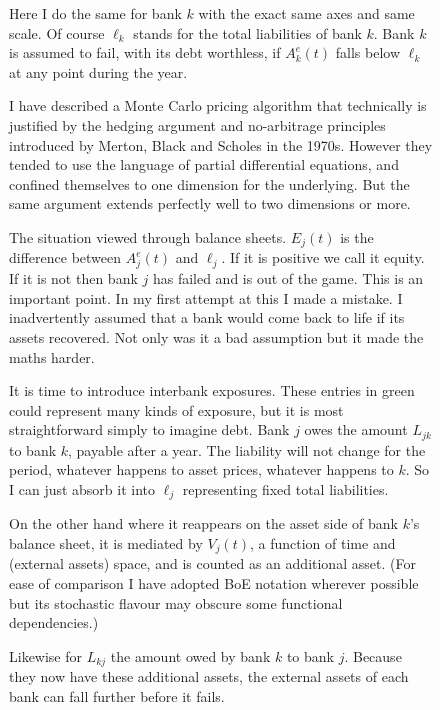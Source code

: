 \documentclass[a4paper,11pt]{article}
\newcommand{\ass}[2]{A^{e}_{#1}(#2)}
\newcommand{\lia}[1]{\ell_{#1}}
\newcommand{\val}[2]{V_{#1}(#2)}
\newcommand{\equ}[2]{E_{#1}(#2)}
\begin{document}
  \begin{figure}[H]
    \begin{center}
    \end{center}
    \ttfamily
    Here I do the same for bank $k$ with the exact same axes and same scale.
    Of course $\lia{k}$ stands for the total liabilities of bank $k$.
    Bank $k$ is assumed to fail, with its debt worthless, if $\ass{k}{t}$ falls below $\lia{k}$
    at any point during the year.

    I have described a Monte Carlo pricing algorithm that technically is justified by the hedging argument
    and no-arbitrage principles introduced by Merton, Black and Scholes in the 1970s.
    However they tended to use the language of partial differential equations,
    and confined themselves to one dimension for the underlying.
    But the same argument extends perfectly well to two dimensions or more.
  \end{figure}
  \begin{figure}[H]
    \begin{center}
    \end{center}
    \ttfamily
    The situation viewed through balance sheets.
    $\equ{j}{t}$ is the difference between $\ass{j}{t}$ and $\lia{j}$.
    If it is positive we call it equity.
    If it is not then bank $j$ has failed and is out of the game.
    This is an important point.
    In my first attempt at this I made a mistake.
    I inadvertently assumed that a bank would come back to life if its assets recovered.
    Not only was it a bad assumption but it made the maths harder.
  \end{figure}
  \begin{figure}[H]
    \begin{center}
    \end{center}
    \ttfamily
    It is time to introduce interbank exposures.
    These entries in green could represent many kinds of exposure, but it is most straightforward simply to imagine debt.
    Bank $j$ owes the amount $L_{jk}$ to bank $k$, payable after a year.
    The liability will not change for the period, whatever happens to asset prices, whatever happens to $k$.
    So I can just absorb it into $\lia{j}$ representing fixed total liabilities.

    On the other hand where it reappears on the asset side of bank $k$'s balance sheet,
    it is mediated by $\val{j}{t}$, a function of time and (external assets) space, and is counted as an additional asset.
    (For ease of comparison I have adopted BoE notation wherever possible
    but its stochastic flavour may obscure some functional dependencies.)

    Likewise for $L_{kj}$ the amount owed by bank $k$ to bank $j$.
    Because they now have these additional assets, the external assets of each bank can fall further before it fails.
  \end{figure}
\end{document}
